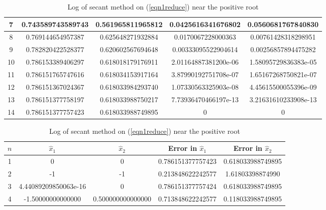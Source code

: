\begin{table}[H]
\begin{table}[H]
\begin{table}[H]
\begin{table}[H]
\begin{table}[htbp]
\begin{subtable}[t]{\textwidth}
\begin{tabular}{|c|c|c|c|c|}
		7	&	\footnotesize	0.743589743589743		&	\footnotesize	0.561965811965812	&	\footnotesize	0.0425616341676802		&	\footnotesize	0.0560681767840830		\\	\hline
		8	&	\footnotesize	0.769144654957387		&	\footnotesize	0.625648271932884	&	\footnotesize	0.0170067228000363		&	\footnotesize	0.00761428318298951		\\	\hline
		9	&	\footnotesize	0.782820422528377		&	\footnotesize	0.620602567694648	&	\footnotesize	0.00333095522904614		&	\footnotesize	0.00256857894475282		\\	\hline
		10	&	\footnotesize	0.786153389406297		&	\footnotesize	0.618018179176911	&	\footnotesize	2.01164887381200e-06	&	\footnotesize	1.58095729836383e-05	\\	\hline
		11	&	\footnotesize	0.786151765747616		&	\footnotesize	0.618034153917164	&	\footnotesize	3.87990192751708e-07	&	\footnotesize	1.65167268750821e-07	\\	\hline
		12	&	\footnotesize	0.786151367024367		&	\footnotesize	0.618033984293740	&	\footnotesize	1.07330563325903e-08	&	\footnotesize	4.45615500055396e-09	\\	\hline
		13	&	\footnotesize	0.786151377758197		&	\footnotesize	0.618033988750217	&	\footnotesize	7.73936470466197e-13	&	\footnotesize	3.21631610233908e-13	\\	\hline
		14	&	\footnotesize	0.786151377757423		&	\footnotesize	0.618033988749895	&	\footnotesize	0						&	\footnotesize	0						\\	\hline
		\end{tabular}
		\caption{Log of secant method on (\ref{eqn1reduce}) near the positive root}
		\label{logeqn1se+}
	\end{subtable}	
	\begin{subtable}[t]{\textwidth}
		\centering
		\begin{tabular}{|c|c|c|c|c|}
		\hline
		\(n\)	&	\(\hat{x}_1\)	&	\(\hat{x}_2\)	&	Error in \(\hat{x}_1\)	&	Error in \(\hat{x}_2\)		\\	\hline
		1	&	\footnotesize	0						&	\footnotesize	0					&	\footnotesize	0.786151377757423		&	\footnotesize	0.618033988749895		\\	\hline
		2	&	\footnotesize	-1						&	\footnotesize	-1					&	\footnotesize	0.213848622242577		&	\footnotesize	1.61803398874990		\\	\hline
		3	&	\footnotesize	4.44089209850063e-16	&	\footnotesize	0					&	\footnotesize	0.786151377757424		&	\footnotesize	0.618033988749895		\\	\hline
		4	&	\footnotesize	-1.50000000000000		&	\footnotesize	0.500000000000000	&	\footnotesize	0.713848622242577		&	\footnotesize	0.118033988749895		\\	\hline

\end{tabular}
\end{subtable}
\end{table}
\end{table}
\end{table}
\end{table}
\end{table}
